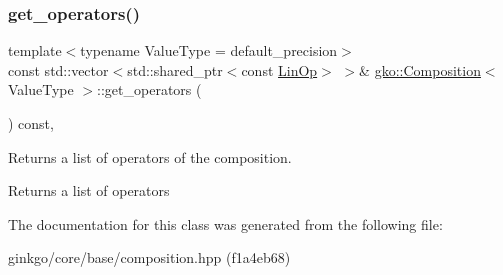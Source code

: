 \subsubsection{\texorpdfstring{get\+\_\+operators()}{get\_operators()}}
{\footnotesize\ttfamily template$<$typename Value\+Type  = default\+\_\+precision$>$ \\
const std\+::vector$<$std\+::shared\+\_\+ptr$<$const \hyperlink{classgko_1_1LinOp}{Lin\+Op}$>$ $>$\& \hyperlink{classgko_1_1Composition}{gko\+::\+Composition}$<$ Value\+Type $>$\+::get\+\_\+operators (\begin{DoxyParamCaption}{ }\end{DoxyParamCaption}) const\hspace{0.3cm}{\ttfamily [inline]}, {\ttfamily [noexcept]}}



Returns a list of operators of the composition. 

\begin{DoxyReturn}{Returns}
a list of operators 
\end{DoxyReturn}


The documentation for this class was generated from the following file\+:\begin{DoxyCompactItemize}
\item 
ginkgo/core/base/composition.\+hpp (f1a4eb68)\end{DoxyCompactItemize}

